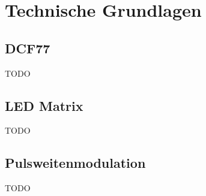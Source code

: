 \section{Technische Grundlagen}
\subsection{DCF77}
TODO

\subsection{LED Matrix}
TODO

\subsection{Pulsweitenmodulation}\label{sec_pulsweitenmodulation}
TODO